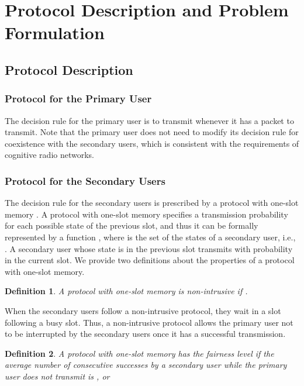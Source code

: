 \documentclass[12pt,draftclsnofoot,onecolumn]{IEEEtran}
\newtheorem{definition}{Definition}
\begin{document}
\section{Protocol Description and Problem Formulation}

\subsection{Protocol Description}

\subsubsection{Protocol for the Primary User}

The decision rule for the primary user is to transmit
whenever it has a packet to transmit. Note that the primary user
does not need to modify its decision rule for coexistence with
the secondary users, which is consistent with the requirements of
cognitive radio networks.

\subsubsection{Protocol for the Secondary Users}

The decision rule for the secondary users is prescribed by a protocol with one-slot memory \cite{park}.
A protocol with one-slot memory specifies a transmission
probability for each possible state of the previous slot, and thus it can be
formally represented by a function ,
where  is the set of the states of a secondary user, i.e.,
.
A secondary user whose state is  in the previous slot
transmits with probability  in the current slot. We provide two definitions
about the properties of a protocol with one-slot memory.

\begin{definition}
A protocol  with one-slot memory is \emph{non-intrusive} if .
\end{definition}

When the secondary users follow a non-intrusive protocol, they wait in a slot
following a busy slot.
Thus, a non-intrusive protocol allows the primary user not to be interrupted
by the secondary users once it has a successful transmission.

\begin{definition}
A protocol  with one-slot memory has the \emph{fairness level} 
if the average number of consecutive successes by a secondary user while the primary
user does not transmit is , or

\end{definition}
\end{document}
